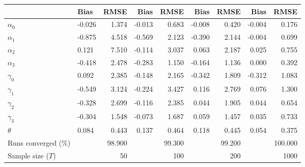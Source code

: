 
\begin{tabular}[t]{llrrrrrrr}
\toprule
  & Bias & RMSE & Bias & RMSE & Bias & RMSE & Bias & RMSE\\
\midrule
$\alpha_{0}$ & -0.026 & 1.374 & -0.013 & 0.683 & -0.008 & 0.420 & -0.004 & 0.176\\
$\alpha_{1}$ & -0.875 & 4.518 & -0.569 & 2.123 & -0.390 & 2.144 & -0.004 & 0.699\\
$\alpha_{2}$ & 0.121 & 7.510 & -0.114 & 3.037 & 0.063 & 2.187 & 0.025 & 0.755\\
$\alpha_{3}$ & -0.418 & 2.478 & -0.283 & 1.150 & -0.164 & 1.136 & 0.000 & 0.392\\
$\gamma_{0}$ & 0.092 & 2.385 & -0.148 & 2.165 & -0.342 & 1.809 & -0.312 & 1.083\\
$\gamma_{1}$ & -0.549 & 3.124 & -0.224 & 3.427 & 0.116 & 2.769 & 0.076 & 1.300\\
$\gamma_{2}$ & -0.328 & 2.699 & -0.116 & 2.385 & 0.044 & 1.905 & 0.044 & 0.654\\
$\gamma_{3}$ & -0.304 & 1.548 & -0.073 & 1.687 & 0.059 & 1.457 & 0.035 & 0.733\\
$\theta$ & 0.084 & 0.443 & 0.137 & 0.464 & 0.118 & 0.445 & 0.054 & 0.375\\
Runs converged (\%) &  & 98.900 &  & 99.300 &  & 99.200 &  & 100.000\\
Sample size ($T$) &  & 50 &  & 100 &  & 200 &  & 1000\\
\bottomrule
\end{tabular}
